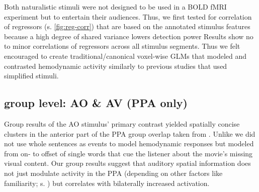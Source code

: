 \documentclass[english]{article}
\begin{document}
Both naturalistic stimuli were not designed to be used in a BOLD fMRI experiment
but to entertain their audiences.
Thus, we first tested for correlation of regressors (s. \ref{fig:reg-corr}) that
are based on the annotated stimulus features because a high degree of shared
variance lowers detection power
Results show no to minor correlations of regressors across all stimulus
segments.
Thus we felt encouraged to create traditional/canonical voxel-wise GLMs that
modeled and contrasted hemodynamic activity similarly to previous studies that
used simplified stimuli.







\subsection{group level: AO \& AV (PPA only)}

Group results of the AO stimulus' primary contrast yielded spatially concise
clusters in the anterior part of the PPA group overlap taken from
\citep{sengupta2016extension}.
Unlike \citep{aziz2008modulation} we did not use whole sentences as events to
model hemodynamic responses but modeled from on- to offset of single words that
cue the listener about the movie's missing visual content.
Our group results suggest that auditory spatial information does not just
modulate activity in the PPA (depending on other factors like familiarity; s.
\citep{aziz2008modulation}) but correlates with bilaterally increased
activation.
\end{document}
